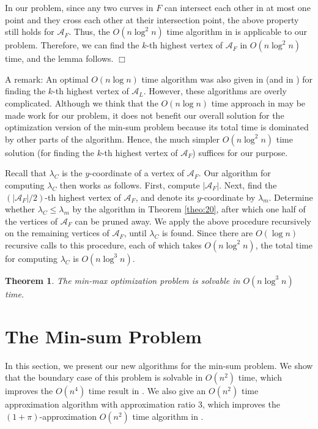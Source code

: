 \documentclass[11pt]{article}
\newenvironment{proof}{\noindent {\textbf{Proof:}}\rm}{\hfill $\Box$
\rm}
\def\calA{\mathcal{A}}
\newtheorem{Theo}{Theorem}
\begin{document}
\begin{proof}
In our problem, since
any two curves in $F$ can intersect each other in at most one point and they
cross each other at their intersection point, the above property still holds for
$\calA_F$. Thus, the $O(n\log^2 n)$ time algorithm in
\cite{ref:ColeAn89} is applicable to our problem. Therefore, we can
find the $k$-th highest vertex of $\calA_F$ in $O(n\log^2 n)$ time, and
the lemma follows.
\end{proof}

A remark: An optimal $O(n\log n)$ time algorithm was also given in
\cite{ref:ColeAn89} (and in \cite{ref:KatzOp93}) for finding the
$k$-th highest vertex of $\calA_L$. However, these algorithms are overly
complicated. Although we think that the $O(n\log n)$ time approach in \cite{ref:ColeAn89} may
be made work for our problem, it does not
benefit our overall solution for the optimization version of the
min-sum problem because its total time is dominated by
other parts of the algorithm. Hence, the much simpler $O(n\log^2 n)$
time solution (for finding the $k$-th highest vertex of $\calA_F$)
suffices for our purpose.


Recall that $\lambda_C$ is the $y$-coordinate of a vertex of
$\calA_F$. Our algorithm for computing $\lambda_C$ then works as follows.
First, compute $|\calA_F|$. Next, find the $(|\calA_F|/2)$-th
highest vertex of $\calA_F$, and denote its $y$-coordinate by
$\lambda_m$. Determine whether $\lambda_C\leq \lambda_m$ by the
algorithm in Theorem \ref{theo:20}, after which one half of the
vertices of $\calA_F$ can be pruned away. We apply the above
procedure recursively on the remaining vertices of $\calA_F$, until
$\lambda_C$ is found. Since there are $O(\log n)$ recursive calls to this procedure,
each of which takes $O(n\log^2 n)$, the
total time for computing $\lambda_C$ is $O(n\log^3 n)$.



\begin{Theo}
The min-max optimization problem is solvable in $O(n\log^3n)$ time.
\end{Theo}


\section{The Min-sum Problem}
\label{sec:minsum}

In this section, we present our new algorithms for the min-sum problem. We show that the
boundary case of this problem is solvable in $O(n^2)$ time, which improves the
$O(n^4)$ time result in \cite{ref:TanNe10}. We also give an $O(n^2)$ time
approximation algorithm with approximation ratio $3$,
which improves the $(1+\pi)$-approximation $O(n^2)$ time
algorithm in \cite{ref:BhattacharyaOp09}.
\end{document}

